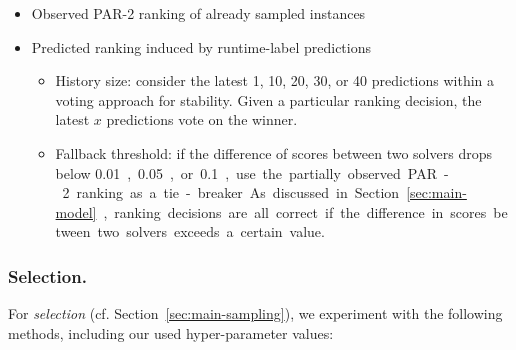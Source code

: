 \documentclass[runningheads]{llncs}
\begin{document}
\begin{itemize}
  \item Observed PAR-2 ranking of already sampled instances
  \item Predicted ranking induced by runtime-label predictions
  \begin{itemize}
    \item
    History size: consider the latest 1, 10, 20, 30, or 40 predictions within a voting approach for stability.
    Given a particular ranking decision, the latest $x$ predictions vote on the winner.
    \item
    Fallback threshold: if the difference of scores between two solvers drops below \SI{0.01}, \SI{0.05}, or \SI{0.1}, use the partially observed PAR-2 ranking as a tie-breaker.
    As discussed in Section~\ref{sec:main-model}, ranking decisions are all correct if the difference in scores between two solvers exceeds a certain value.
  \end{itemize}
\end{itemize}

\subsubsection{Selection.}

For \emph{selection} (cf. Section~\ref{sec:main-sampling}), we experiment with the following methods, including our used hyper-parameter values:
\end{document}
